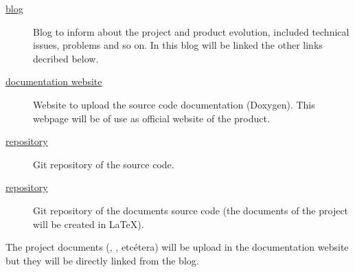 \documentclass[twocolumn]{article}
\begin{document}
\begin{description}
  \item[\href{http://freealgview.blogspot.com}{\fav blog}] Blog to
    inform about the project and product evolution, included technical
    issues, problems and so on. In this blog will be linked the other
    links decribed below.
  \item[\href{http://peregring-lk.github.com/FreeAlgView}{\fav
      documentation website}] Website to upload the \fav source code
    documentation (Doxygen). This webpage will be of use as official
    website of the product.
  \item[\href{https://github.com/Peregring-lk/FreeAlgView}{\fav
      repository}] Git repository of the \fav source code.
  \item[\href{https://github.com/Peregring-lk/FreeAlgView-project-doc}{\favp
  repository}]  Git repository of the \favp documents source code (the
    documents of the project will be created in \LaTeX).
\end{description}

The project documents (\chart, \plan, etcétera) will be upload in
the \fav documentation website but they will be directly linked from
the blog.
\end{document}
